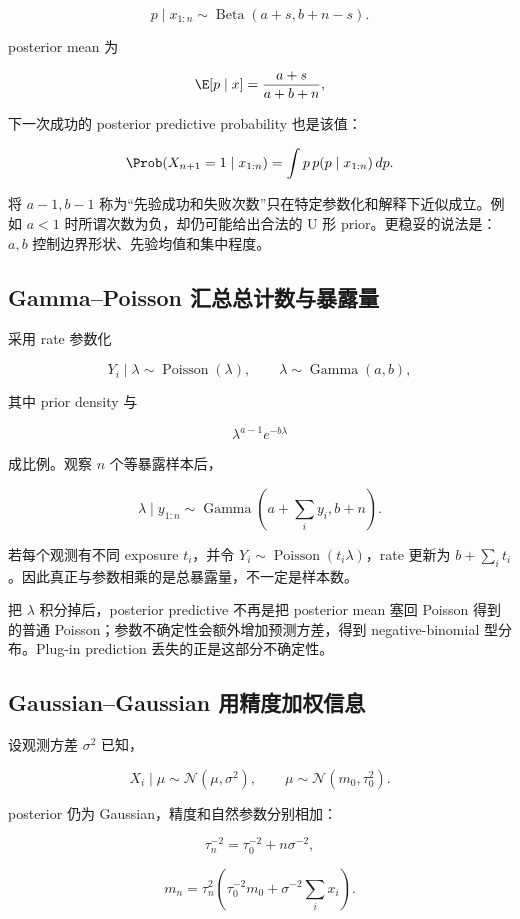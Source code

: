 \[
p\mid x_{1:n}
\sim
\operatorname{Beta}
(a+s,b+n-s).
\]

posterior mean 为

\[
\E[p\mid x]
=\frac{a+s}{a+b+n},
\]

下一次成功的 posterior predictive probability 也是该值：

\[
\Prob(X_{n+1}=1\mid x_{1:n})
=\int p\,p(p\mid x_{1:n})\,dp.
\]

将 \(a-1,b-1\) 称为“先验成功和失败次数”只在特定参数化和解释下近似成立。例如 \(a<1\) 时所谓次数为负，却仍可能给出合法的 U 形 prior。更稳妥的说法是：\(a,b\) 控制边界形状、先验均值和集中程度。

\subsection{Gamma--Poisson 汇总总计数与暴露量}

采用 rate 参数化

\[
Y_i\mid\lambda
\sim\operatorname{Poisson}(\lambda),
\qquad
\lambda
\sim\operatorname{Gamma}(a,b),
\]

其中 prior density 与

\[
\lambda^{a-1}e^{-b\lambda}
\]

成比例。观察 \(n\) 个等暴露样本后，

\[
\lambda\mid y_{1:n}
\sim
\operatorname{Gamma}
\left(
a+\sum_i y_i,
b+n
\right).
\]

若每个观测有不同 exposure \(t_i\)，并令 \(Y_i\sim\operatorname{Poisson}(t_i\lambda)\)，rate 更新为 \(b+\sum_it_i\)。因此真正与参数相乘的是总暴露量，不一定是样本数。

把 \(\lambda\) 积分掉后，posterior predictive 不再是把 posterior mean 塞回 Poisson 得到的普通 Poisson；参数不确定性会额外增加预测方差，得到 negative-binomial 型分布。Plug-in prediction 丢失的正是这部分不确定性。

\subsection{Gaussian--Gaussian 用精度加权信息}

设观测方差 \(\sigma^2\) 已知，

\[
X_i\mid\mu
\sim\mathcal N(\mu,\sigma^2),
\qquad
\mu\sim\mathcal N(m_0,\tau_0^2).
\]

posterior 仍为 Gaussian，精度和自然参数分别相加：

\[
\tau_n^{-2}
=\tau_0^{-2}+n\sigma^{-2},
\]

\[
m_n
=\tau_n^2
\left(
\tau_0^{-2}m_0
+\sigma^{-2}\sum_i x_i
\right).
\]

